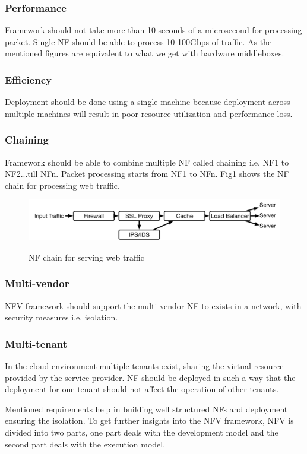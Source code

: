\documentclass[10pt, a4paper, conference]{IEEEtran}
\begin{document}
\subsubsection{Performance} Framework should not take more than 10 seconds of a microsecond for processing packet. Single NF should be able to process 10-100Gbps of traffic. As the mentioned figures are equivalent to what we get with hardware middleboxes.  
\subsubsection{Efficiency} Deployment should be done using a single machine because deployment across multiple machines will result in poor resource utilization and performance loss.
\subsubsection{Chaining} Framework should be able to combine multiple NF called chaining i.e. NF1 to NF2...till NFn. Packet processing starts from NF1 to NFn. Fig1 shows the NF chain for processing web traffic.
\begin{figure}
	\centering
	\includegraphics[width=\linewidth]{figures/fig1}
	\caption{NF chain for serving web traffic}
	\cite{Panda2017}
	\label{key1}
\end{figure}
\subsubsection{Multi-vendor} NFV framework should support the multi-vendor NF to exists in a network, with security measures i.e. isolation.  
\subsubsection{Multi-tenant} In the cloud environment multiple tenants exist, sharing the virtual resource provided by the service provider. NF should be deployed in such a way that the deployment for one tenant should not affect the operation of other tenants. 

Mentioned requirements help in building well structured NFs and deployment ensuring the isolation. To get further insights into the NFV framework, NFV is divided into two parts, one part deals with the development model and the second part deals with the execution model.
\end{document}
